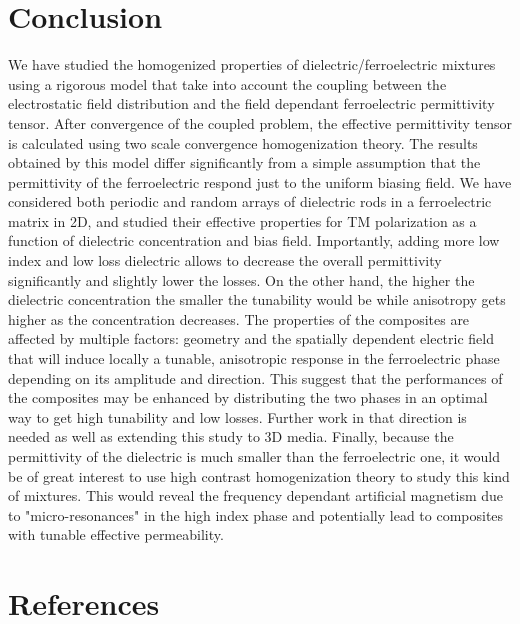 \documentclass[%
 reprint,
 amsmath,amssymb,
 aps,
]{revtex4-2}
\begin{document}

\section*{Conclusion}

We have studied the homogenized properties of dielectric/ferroelectric mixtures
using a rigorous model that take into account the coupling between the electrostatic
field distribution and the field dependant ferroelectric permittivity tensor. After
convergence of the coupled problem, the effective permittivity tensor is calculated using
two scale convergence homogenization theory.
The results obtained by this model differ significantly from a simple assumption that
the permittivity of the ferroelectric respond just to the uniform biasing field.
We have considered both periodic and random arrays
of dielectric rods in a ferroelectric matrix in 2D, and studied their effective properties
for TM polarization as a function of dielectric concentration and bias field.
Importantly, adding more low index and low loss dielectric allows to decrease
the overall permittivity significantly and slightly lower the losses. On the other hand,
the higher the dielectric concentration the smaller the tunability would be while
anisotropy gets higher as the concentration decreases.
The properties of the composites are affected by multiple factors:
 geometry and the spatially dependent electric field that will induce locally a tunable, anisotropic
 response in the ferroelectric phase depending on its amplitude and direction.
 This suggest that the performances of the composites
 may be enhanced by distributing the two phases in an optimal way to get high
  tunability and low losses. Further work in that direction is needed as well as
  extending this study to 3D media.
 Finally, because the permittivity of the dielectric is much smaller than the ferroelectric one,
 it would be of great interest to use high contrast homogenization theory
 \cite{BOUCHITTE2004377, cherednichenko_cooper_2015} to
 study this kind of mixtures.
 This would reveal the frequency dependant artificial magnetism due to "micro-resonances"
 in the high index phase and potentially lead to composites with tunable effective permeability.


%
%


\section*{References}
% 

\end{document}
